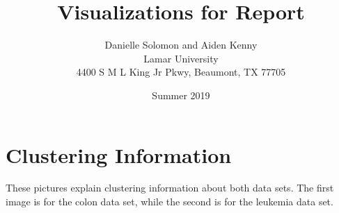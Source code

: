 \documentclass[10pt]{article}
\begin{document}

\title{Visualizations for Report}
\author{Danielle Solomon and Aiden Kenny\\
Lamar University\\
4400 S M L King Jr Pkwy, Beaumont, TX 77705}
\date{Summer 2019}
\maketitle


\section{Clustering Information} 

These pictures explain clustering information about both data sets. The first image is for the colon data set, while the second is for the leukemia data set.
\end{document}
